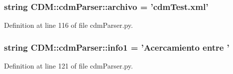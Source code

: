 \subsubsection[{archivo}]{\setlength{\rightskip}{0pt plus 5cm}string {\bf \-C\-D\-M\-::cdm\-Parser\-::archivo} = 'cdm\-Test.\-xml'}\label{namespace_c_d_m_1_1cdm_parser_a596846ed946122c4c50bf17746fcc8c1}


\-Definition at line 116 of file cdm\-Parser.\-py.

\subsubsection[{info1}]{\setlength{\rightskip}{0pt plus 5cm}string {\bf \-C\-D\-M\-::cdm\-Parser\-::info1} = '\-Acercamiento entre '}\label{namespace_c_d_m_1_1cdm_parser_af6b27ddcc8dbdf433fe024867c90dbc8}


\-Definition at line 121 of file cdm\-Parser.\-py.

